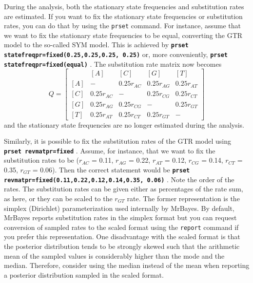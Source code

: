 \documentclass[12pt]{book}
\newcommand{\ttt}[1]{\texttt{#1} }
\newcommand{\tb}[1]{\texttt{\textbf{#1}} }
\begin{document}
During the analysis, both the stationary state frequencies and substitution rates are estimated. If
you want to fix the stationary state frequencies or substitution rates, you can do that by using
the \ttt{prset} command. For instance, assume that we want to fix the stationary state frequencies
to be equal, converting the GTR model to the so-called SYM model. This is achieved by \tb{prset
statefreqpr=fixed(0.25,0.25,0.25, 0.25)} or, more conveniently, \tb{prset
statefreqpr=fixed(equal)}. The substitution rate matrix now becomes \[ Q=\begin{bmatrix} & [A] &
    [C] & [G] & [T] \\ [A]& - & 0.25 r_{AC} & 0.25 r_{AG} & 0.25 r_{AT}\\ [C]& 0.25 r_{AC} & - &
0.25 r_{CG} &0.25 r_{CT} \\ [G]& 0.25 r_{AG} & 0.25 r_{CG}& - & 0.25 r_{GT}\\ [T]& 0.25 r_{AT} &
0.25 r_{CT}&0.25 r_{GT}  & - \end{bmatrix} \] and the stationary state frequencies are no longer
estimated during the analysis.

Similarly, it is possible to fix the substitution rates of the GTR model using \tb{prset
revmatpr=fixed}. Assume, for instance, that we want to fix the substitution rates to be ($r_{AC}$ =
0.11, $r_{AG}$ = 0.22, $r_{AT}$ = 0.12, $r_{CG}$ = 0.14, $r_{CT}$ = 0.35, $r_{GT}$ = 0.06).  Then
the correct statement would be \tb{prset revmatpr=fixed(0.11,0.22,0.12,0.14,0.35, 0.06)}. Note the
order of the rates. The substitution rates can be given either as percentages of the rate sum, as
here, or they can be scaled to the $r_{GT}$ rate. The former representation is the simplex
(Dirichlet) parameterization used internally by MrBayes. By default, MrBayes reports substitution
rates in the simplex format but you can request conversion of sampled rates to the scaled format
using the \ttt{report} command if you prefer this representation. One disadvantage with the scaled
format is that the posterior distribution tends to be strongly skewed such that the arithmetic mean
of the sampled values is considerably higher than the mode and the median. Therefore, consider
using the median instead of the mean when reporting a posterior distribution sampled in the scaled
format.
\end{document}
